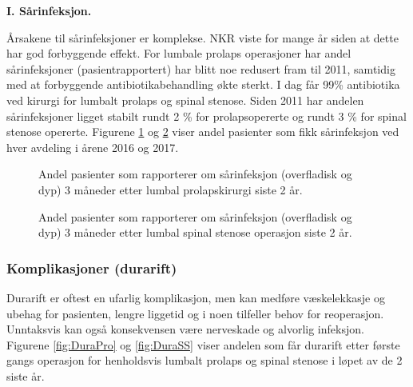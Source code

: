 \textbf{I. Sårinfeksjon.}

Årsakene til sårinfeksjoner er komplekse. NKR viste for mange år siden at dette har god forbyggende effekt. For lumbale prolaps operasjoner har
andel sårinfeksjoner (pasientrapportert) har blitt noe redusert fram til 2011, samtidig med at forbyggende antibiotikabehandling økte sterkt. I dag får 99\% antibiotika ved kirurgi for lumbalt prolaps og spinal stenose. Siden 2011 har andelen sårinfeksjoner ligget stabilt rundt 2 \% for prolapsopererte og rundt 3 \% for spinal stenose opererte.
Figurene \ref{fig:KpInfAvdPro} og \ref{fig:KpInfAvdSS} viser andel pasienter som fikk sårinfeksjon ved hver avdeling i årene 2016 og 2017.

      





\begin{figure}[ht]
\caption{\label{fig:KpInfAvdPro} Andel pasienter som rapporterer om sårinfeksjon 
      (overfladisk og dyp) 3 måneder etter lumbal prolapskirurgi siste 2 år.}
\end{figure}

\begin{figure}[ht]
\caption{\label{fig:KpInfAvdSS} Andel pasienter som rapporterer om sårinfeksjon 
      (overfladisk og dyp) 3 måneder etter lumbal spinal stenose operasjon siste 2 år.}
\end{figure}

\clearpage

\subsubsection{Komplikasjoner (durarift)}


Durarift er oftest en ufarlig komplikasjon, men kan medføre væskelekkasje og
ubehag for pasienten, lengre liggetid og i noen tilfeller behov for reoperasjon.
Unntaksvis kan også konsekvensen være nerveskade og alvorlig infeksjon. Figurene \ref{fig:DuraPro} og \ref{fig:DuraSS} 
viser andelen som får durarift etter første gangs operasjon for henholdsvis lumbalt prolaps og spinal stenose i løpet av de 2 siste år.

